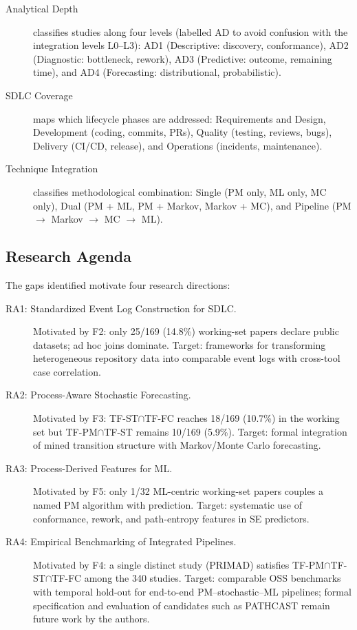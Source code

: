 \begin{description}
\item[Analytical Depth] classifies studies along four levels (labelled AD
  to avoid confusion with the integration levels L0--L3): AD1
  (Descriptive: discovery, conformance), AD2 (Diagnostic: bottleneck, rework),
  AD3 (Predictive: outcome, remaining time), and AD4 (Forecasting:
  distributional, probabilistic).

\item[SDLC Coverage] maps which lifecycle phases are addressed: Requirements
  and Design, Development (coding, commits, PRs), Quality (testing, reviews,
  bugs), Delivery (CI/CD, release), and Operations (incidents, maintenance).

\item[Technique Integration] classifies methodological combination:
  Single (PM only, ML only, MC only), Dual (PM + ML, PM + Markov, Markov + MC),
  and Pipeline (PM $\rightarrow$ Markov $\rightarrow$ MC $\rightarrow$ ML).
\end{description}


\subsection{Research Agenda}
\label{sec:slr-agenda}

The gaps identified motivate four research directions:

\begin{description}
\item[RA1: Standardized Event Log Construction for SDLC.]
  Motivated by F2: only 25/169 (14.8\%) working-set papers declare public
  datasets; ad hoc joins dominate. Target: frameworks for transforming
  heterogeneous repository data into comparable event logs with cross-tool
  case correlation.

\item[RA2: Process-Aware Stochastic Forecasting.]
  Motivated by F3: TF-ST$\cap$TF-FC reaches 18/169 (10.7\%) in the working set
  but TF-PM$\cap$TF-ST remains 10/169 (5.9\%). Target: formal integration of
  mined transition structure with Markov/Monte Carlo forecasting.

\item[RA3: Process-Derived Features for ML.]
  Motivated by F5: only 1/32 ML-centric working-set papers couples a named PM
  algorithm with prediction. Target: systematic use of conformance, rework,
  and path-entropy features in SE predictors.

\item[RA4: Empirical Benchmarking of Integrated Pipelines.]
  Motivated by F4: a single distinct study (PRIMAD) satisfies
  TF-PM$\cap$TF-ST$\cap$TF-FC among the 340 studies. Target: comparable OSS
  benchmarks with temporal hold-out for end-to-end PM--stochastic--ML
  pipelines; formal specification and evaluation of candidates such as
  PATHCAST remain future work by the authors.
\end{description}


